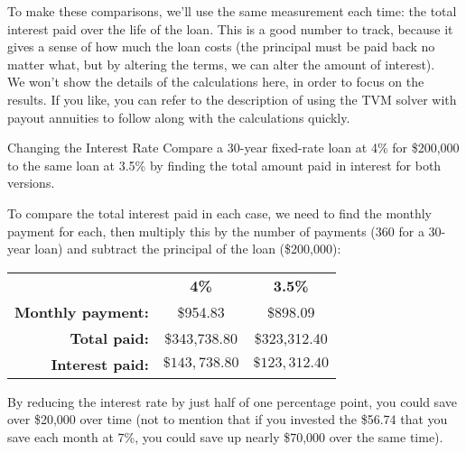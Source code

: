 To make these comparisons, we'll use the same measurement each time: the total interest paid over the life of the loan.  This is a good number to track, because it gives a sense of how much the loan costs (the principal must be paid back no matter what, but by altering the terms, we can alter the amount of interest).\\

We won't show the details of the calculations here, in order to focus on the results.  If you like, you can refer to the description of using the TVM solver with payout annuities to follow along with the calculations quickly.

\begin{example}{Changing the Interest Rate}
Compare a 30-year fixed-rate loan at 4\% for \$200,000 to the same loan at 3.5\% by finding the total amount paid in interest for both versions.

\sol
To compare the total interest paid in each case, we need to find the monthly payment for each, then multiply this by the number of payments (360 for a 30-year loan) and subtract the principal of the loan (\$200,000):
\begin{center}
\begin{tabular}{r c c}
& \textbf{4\%} & \textbf{3.5\%}\\
\textbf{Monthly payment:} & \$954.83 & \$898.09\\
\textbf{Total paid:} & \$343,738.80 & \$323,312.40\\
\textbf{Interest paid:} & $\boxed{\$143,738.80}$ & $\boxed{\$123,312.40}$
\end{tabular}
\end{center}

By reducing the interest rate by just half of one percentage point, you could save over \$20,000 over time (not to mention that if you invested the \$56.74 that you save each month at 7\%, you could save up nearly \$70,000 over the same time).
\end{example}

